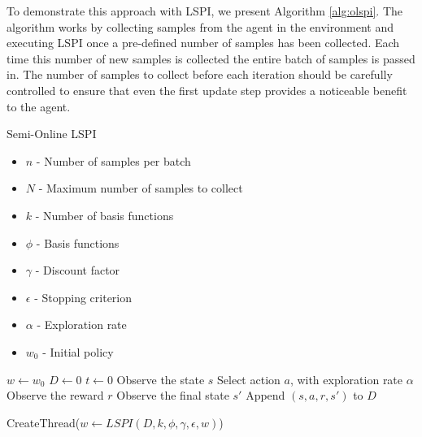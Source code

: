 To demonstrate this approach with LSPI, we present Algorithm \ref{alg:olspi}. The algorithm works by collecting samples from the agent in the environment and executing LSPI once a pre-defined number of samples has been collected. Each time this number of new samples is collected the entire batch of samples is passed in. The number of samples to collect before each iteration should be carefully controlled to ensure that even the first update step provides a noticeable benefit to the agent.

\begin{algorithm}
\caption{Semi-Online LSPI}
\label{alg:olspi}
    {\fontsize{12}{10}\selectfont
    \begin{algorithmic}[1]
        \REQUIRE
            \begin{itemize} 
                \item $n$ - Number of samples per batch
                \item $N$ - Maximum number of samples to collect
                \item $k$ - Number of basis functions
                \item $\phi$ - Basis functions
                \item $\gamma$ - Discount factor
                \item $\epsilon$ - Stopping criterion
                \item $\alpha$ - Exploration rate
                \item $w_0$ - Initial policy
            \end{itemize}
        \STATE $w \leftarrow w_0$ 
        \STATE $D \leftarrow 0$
        \STATE $t \leftarrow 0$
                \STATE Observe the state $s$
                \STATE Select action $a$, with exploration rate $\alpha$
                \STATE Observe the reward $r$
                \STATE Observe the final state $s'$
                    \STATE Append $(s,a,r,s')$ to $D$
                \ENDIF
            \ENDFOR
            
            \STATE CreateThread($w \leftarrow LSPI(D, k, \phi, \gamma, \epsilon, w)$)
        \ENDWHILE
    \end{algorithmic}
    }
\end{algorithm}

